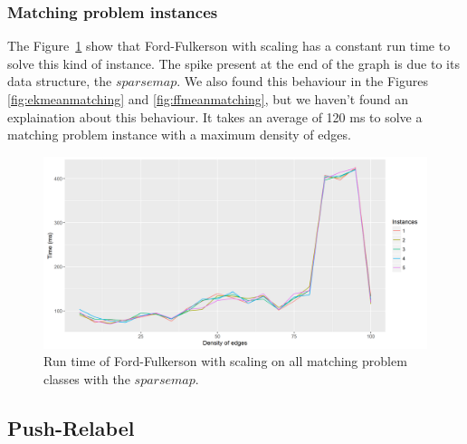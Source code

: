 \subsubsection{Matching problem instances}
The Figure~\ref{fig:ffmatching} show that Ford-Fulkerson with scaling has a constant run time to solve this kind of instance. The spike present at the end of the graph is due to its data structure, the $sparse map$. We also found this behaviour in the Figures \ref{fig:ekmeanmatching} and \ref{fig:ffmeanmatching}, but we haven't found an explaination about this behaviour. It takes an average of 120 ms to solve a matching problem instance with a maximum density of edges.
\begin{figure}[H]
\begin{center}
\includegraphics[scale=0.5]{images/results/ffmatching.png}
\caption{Run time of Ford-Fulkerson with scaling on all matching problem classes with the $sparse map$.}
\label{fig:ffmatching}
\end{center}
\end{figure}


\subsection{Push-Relabel}
